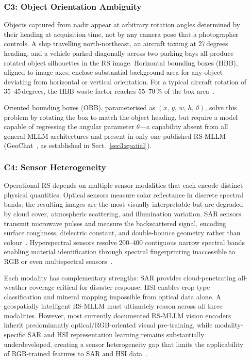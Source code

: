 \subsubsection{C3: Object Orientation Ambiguity}\label{sec2:orientation}

Objects captured from nadir appear at arbitrary rotation angles determined by
their heading at acquisition time, not by any camera pose that a photographer
controls. A ship travelling north-northeast, an aircraft taxiing at 27\,degrees
heading, and a vehicle parked diagonally across two parking bays all produce
rotated object silhouettes in the RS image. Horizontal bounding boxes (HBB),
aligned to image axes, enclose substantial background area for any object
deviating from horizontal or vertical orientation. For a typical aircraft
rotation of 35--45\,degrees, the HBB waste factor reaches 55--70\,\% of the
box area~\cite{xia2018dota, ding2021object}.

Oriented bounding boxes (OBB), parameterised as $(x,\,y,\,w,\,h,\,\theta)$,
solve this problem by rotating the box to match the object heading, but require
a model capable of regressing the angular parameter $\theta$---a capability
absent from all general MLLM architectures and present in only one published
RS-MLLM (GeoChat~\cite{geochat2024}, as established in Sect.~\ref{sec3:spatial}).

\subsubsection{C4: Sensor Heterogeneity}\label{sec2:sensor}

Operational RS depends on multiple sensor modalities that each encode distinct
physical quantities. Optical sensors measure solar reflectance in discrete
spectral bands; the resulting images are the most visually interpretable but
are degraded by cloud cover, atmospheric scattering, and illumination variation.
SAR sensors transmit microwave pulses and measure the backscattered signal,
encoding surface roughness, dielectric constant, and double-bounce geometry
rather than colour~\cite{sentinel12014, schmitt2019fusion}. Hyperspectral sensors
resolve 200--400 contiguous narrow spectral bands enabling material identification
through spectral fingerprinting inaccessible to RGB or even multispectral
sensors~\cite{hong2021multimodal}.

Each modality has complementary strengths: SAR provides cloud-penetrating
all-weather coverage critical for disaster response; HSI enables crop-type
classification and mineral mapping impossible from optical data alone. A
geospatially intelligent RS-MLLM must ultimately reason across all three
modalities. However, most currently documented RS-MLLM vision encoders
inherit predominantly optical/RGB-oriented visual pre-training, while
modality-specific SAR and HSI representation learning remains substantially
underdeveloped, creating a sensor heterogeneity gap that limits the
applicability of RGB-trained features to SAR and HSI data~\cite{hmbench2026}.

